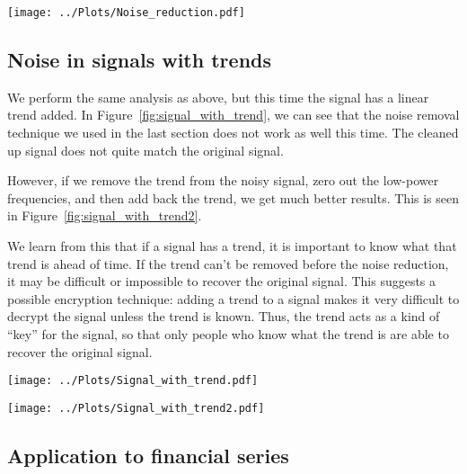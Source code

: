 \documentclass[twocolumn]{myarticle}
\begin{document}
\begin{figure*}[htpb]
    \centering
    \texttt{[image: ../Plots/Noise\_reduction.pdf]}
    \caption{Use of Fourier transform to remove noise from a signal.}
    \label{fig:noise_reduction}
\end{figure*}

\subsection{Noise in signals with trends}
\label{subsec:noise_in_signals_with_trends}

We perform the same analysis as above, but this time the signal has a linear trend added.
In Figure~\ref{fig:signal_with_trend}, we can see that the noise removal technique we used in the last section does not work as well this time.
The cleaned up signal does not quite match the original signal.

However, if we remove the trend from the noisy signal, zero out the low-power frequencies, and then add back the trend, we get much better results.
This is seen in Figure~\ref{fig:signal_with_trend2}.

We learn from this that if a signal has a trend, it is important to know what that trend is ahead of time.
If the trend can't be removed before the noise reduction, it may be difficult or impossible to recover the original signal.
This suggests a possible encryption technique: adding a trend to a signal makes it very difficult to decrypt the signal unless the trend is known.
Thus, the trend acts as a kind of ``key'' for the signal, so that only people who know what the trend is are able to recover the original signal.

\begin{figure*}[htpb]
    \centering
    \texttt{[image: ../Plots/Signal\_with\_trend.pdf]}
    \caption{Noise removed from a signal with a trend.}
    \label{fig:signal_with_trend}
\end{figure*}

\begin{figure*}[htpb]
    \centering
    \texttt{[image: ../Plots/Signal\_with\_trend2.pdf]}
    \caption{Noise removed from a signal with a trend. This time the trend was removed before the noise was removed, and then added back in later.}
    \label{fig:signal_with_trend2}
\end{figure*}

\subsection{Application to financial series}
\label{subsec:application_to_financial_series}
\end{document}
